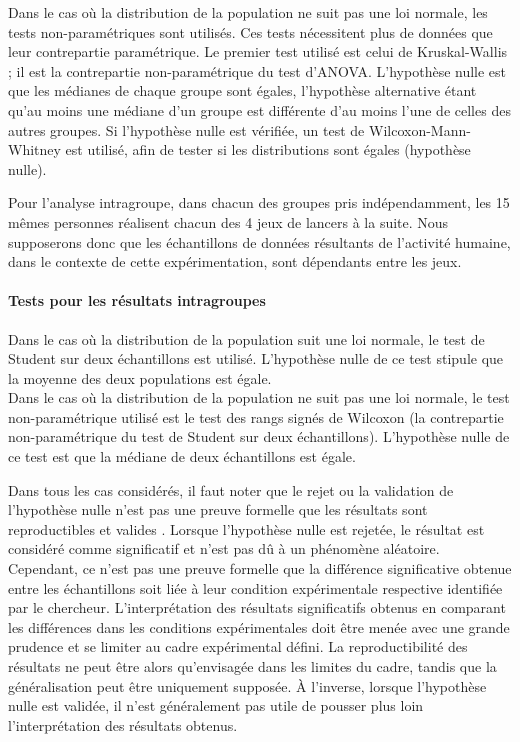 Dans le cas où la distribution de la population ne suit pas une loi normale, les tests non-paramétriques sont utilisés. Ces tests nécessitent plus de données que leur contrepartie paramétrique. Le premier test utilisé est celui de Kruskal-Wallis ; il est la contrepartie non-paramétrique du test d'ANOVA. L'hypothèse nulle est que les médianes de chaque groupe sont égales, l'hypothèse alternative étant qu'au moins une médiane d'un groupe est différente d'au moins l'une de celles des autres groupes. Si l'hypothèse nulle est vérifiée, un test de Wilcoxon-Mann-Whitney est utilisé, afin de tester si les distributions sont égales (hypothèse nulle).


Pour l'analyse intragroupe, dans chacun des groupes pris indépendamment, les 15 mêmes personnes réalisent chacun des 4 jeux de lancers à la suite. Nous supposerons donc que les échantillons de données résultants de l'activité humaine, dans le contexte de cette expérimentation, sont dépendants entre les jeux.

\paragraph{Tests pour les résultats intragroupes}
Dans le cas où la distribution de la population suit une loi normale, le test de Student sur deux échantillons est utilisé. L'hypothèse nulle de ce test stipule que la moyenne des deux populations est égale.\\

Dans le cas où la distribution de la population ne suit pas une loi normale, le test non-paramétrique utilisé est le test des rangs signés de Wilcoxon (la contrepartie non-paramétrique du test de Student sur deux échantillons). L'hypothèse nulle de ce test est que la médiane de deux échantillons est égale.
\vspace{0.5cm}


Dans tous les cas considérés, il faut noter que le rejet ou la validation de l'hypothèse nulle n'est pas une preuve formelle que les résultats sont reproductibles et valides \parencite{Halsey2015Tfp}. Lorsque l'hypothèse nulle est rejetée, le résultat est considéré comme significatif et n'est pas dû à un phénomène aléatoire. Cependant, ce n'est pas une preuve formelle que la différence significative obtenue entre les échantillons soit liée à leur condition expérimentale respective identifiée par le chercheur. L'interprétation des résultats significatifs obtenus en comparant les différences dans les conditions expérimentales doit être menée avec une grande prudence et se limiter au cadre expérimental défini. La reproductibilité des résultats ne peut être alors qu'envisagée dans les limites du cadre, tandis que la généralisation peut être uniquement supposée. À l'inverse, lorsque l'hypothèse nulle est validée, il n'est généralement pas utile de pousser plus loin l'interprétation des résultats obtenus.

